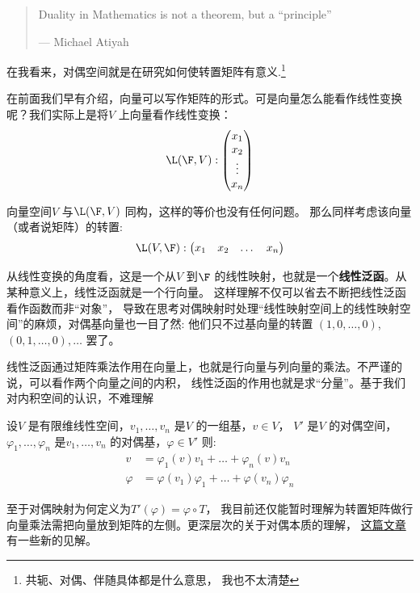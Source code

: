 \begin{quote}
  Duality in Mathematics is not a theorem, but a ``principle''

  \hfill --- Michael Atiyah
\end{quote}

在我看来，对偶空间就是在研究如何使转置矩阵有意义.\footnote{共轭、对偶、伴随具体都是什么意思，
我也不太清楚}

在前面我们早有介绍，向量可以写作矩阵的形式。可是向量怎么能看作线性变换呢？我们实际上是将\(V\)
上向量看作线性变换：\[
  \L(\F,V):
  \begin{pmatrix}
    x_1 \\
    x_2 \\
    \vdots \\
    x_n
  \end{pmatrix}
\]

向量空间\(V\) 与\(\L(\F,V)\) 同构，这样的等价也没有任何问题。
那么同样考虑该向量（或者说矩阵）的转置:
\[
  \L(V,\F):
  \begin{pmatrix}
    x_1 & x_2 & \dots & x_n
  \end{pmatrix}
\]

从线性变换的角度看，这是一个从\(V\) 到\(\F\) 的线性映射，也就是一个\textbf{线性泛函}。从某种意义上，线性泛函就是一个行向量。
这样理解不仅可以省去不断把线性泛函看作函数而非``对象''，
导致在思考对偶映射时处理``线性映射空间上的线性映射空间''的麻烦，对偶基向量也一目了然:
他们只不过基向量的转置 \((1,0,\dots ,0)\),\((0,1,\dots ,0),\dots \) 罢了。

线性泛函通过矩阵乘法作用在向量上，也就是行向量与列向量的乘法。不严谨的说，可以看作两个向量之间的内积，
线性泛函的作用也就是求``分量''。基于我们对内积空间的认识，不难理解
\begin{theorem}
  设\(V\) 是有限维线性空间，\(v_{1}, \dots ,v_{n}\) 是\(V\) 的一组基，\(v \in V\)，
  \(V'\) 是\(V\) 的对偶空间，\(\varphi_{1}, \dots ,\varphi_{n}\)
  是\(v_{1}, \dots ,v_{n}\) 的对偶基，\(\varphi \in V'\)
  则:
  \begin{align*}
    v &= \varphi_{1}(v)v_{1} + \dots + \varphi_{n}(v)v_{n} \\
    \varphi &= \varphi(v_{1})\varphi_{1} + \dots +
    \varphi(v_{n})\varphi_{n}
  \end{align*}
\end{theorem}

至于对偶映射为何定义为\(T'(\varphi)=\varphi \circ T\)，
我目前还仅能暂时理解为转置矩阵做行向量乘法需把向量放到矩阵的左侧。更深层次的关于对偶本质的理解，
\href{https://www.zhihu.com/question/38464481/answer/2110009942}{这篇文章}有一些新的见解。
